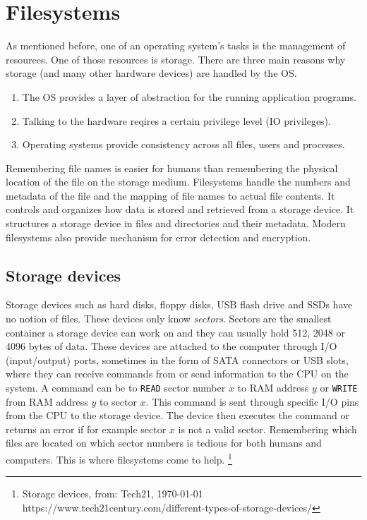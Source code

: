 \section{Filesystems}

As mentioned before, one of an operating system's tasks is the management of resources.
One of those resources is storage. There are three main reasons why storage (and many other
hardware devices) are handled by the OS.
\begin{enumerate}
\item The OS provides a layer of abstraction for the running application programs. 
\item Talking to the hardware reqires a certain privilege level (IO privileges).
\item Operating systems provide consistency across all files, users and processes.
\end{enumerate}

Remembering file names is easier for humans than remembering the physical location of the file on the storage medium. Filesystems handle
the numbers and metadata of the file and the mapping of file names to actual file contents. It
controls and organizes how data is stored and retrieved from a storage device. It structures a storage
device in files and directories and their metadata. Modern filesystems also provide mechanism for
error detection and encryption.

\subsection{Storage devices}

Storage devices such as hard disks, floppy disks, USB flash drive and SSDs have no notion of files.
These devices only know \textit{sectors}. Sectors are the smallest container a storage device
can work on and they can usually hold 512, 2048 or 4096 bytes of data. These devices are attached to
the computer through I/O (input/output) ports, sometimes in the form of SATA connectors or USB slots, where they can
receive commands from or send information to the CPU on the system. A command can be to \texttt{READ} sector number $x$ to RAM
address $y$ or \texttt{WRITE} from RAM address $y$ to sector $x$. This command is sent through
specific I/O pins from the CPU to the storage device. The device then executes the command or returns
an error if for example sector $x$ is not a valid sector. Remembering which files are located on
which sector numbers is tedious for both humans and computers. This is where filesystems come to help.
\footnote{Storage devices, from: Tech21, \today  \\ https://www.tech21century.com/different-types-of-storage-devices/}

